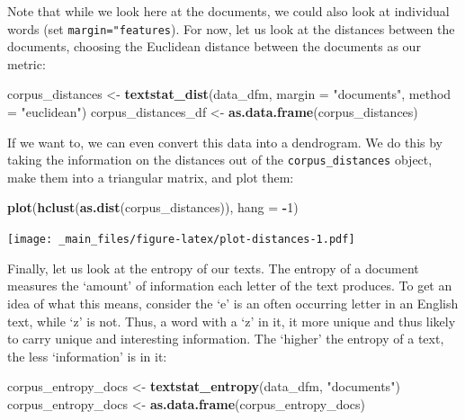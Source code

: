 \documentclass[
]{book}
\newenvironment{Shaded}{\begin{snugshade}}{\end{snugshade}}
\newcommand{\AttributeTok}[1]{\textcolor[rgb]{0.13,0.29,0.53}{#1}}
\newcommand{\DecValTok}[1]{\textcolor[rgb]{0.00,0.00,0.81}{#1}}
\newcommand{\FunctionTok}[1]{\textcolor[rgb]{0.13,0.29,0.53}{\textbf{#1}}}
\newcommand{\NormalTok}[1]{#1}
\newcommand{\OtherTok}[1]{\textcolor[rgb]{0.56,0.35,0.01}{#1}}
\newcommand{\SpecialCharTok}[1]{\textcolor[rgb]{0.81,0.36,0.00}{\textbf{#1}}}
\newcommand{\StringTok}[1]{\textcolor[rgb]{0.31,0.60,0.02}{#1}}
\begin{document}
Note that while we look here at the documents, we could also look at individual words (set \texttt{margin="features}). For now, let us look at the distances between the documents, choosing the Euclidean distance between the documents as our metric:

\begin{Shaded}
\begin{Highlighting}[]
\NormalTok{corpus\_distances }\OtherTok{\textless{}{-}} \FunctionTok{textstat\_dist}\NormalTok{(data\_dfm, }\AttributeTok{margin =} \StringTok{"documents"}\NormalTok{, }\AttributeTok{method =} \StringTok{"euclidean"}\NormalTok{)}
\NormalTok{corpus\_distances\_df }\OtherTok{\textless{}{-}} \FunctionTok{as.data.frame}\NormalTok{(corpus\_distances)}
\end{Highlighting}
\end{Shaded}

If we want to, we can even convert this data into a dendrogram. We do this by taking the information on the distances out of the \texttt{corpus\_distances} object, make them into a triangular matrix, and plot them:

\begin{Shaded}
\begin{Highlighting}[]
\FunctionTok{plot}\NormalTok{(}\FunctionTok{hclust}\NormalTok{(}\FunctionTok{as.dist}\NormalTok{(corpus\_distances)), }\AttributeTok{hang =} \SpecialCharTok{{-}}\DecValTok{1}\NormalTok{)}
\end{Highlighting}
\end{Shaded}

\texttt{[image: \_main\_files/figure-latex/plot-distances-1.pdf]}

Finally, let us look at the entropy of our texts. The entropy of a document measures the `amount' of information each letter of the text produces. To get an idea of what this means, consider the `e' is an often occurring letter in an English text, while `z' is not. Thus, a word with a `z' in it, it more unique and thus likely to carry unique and interesting information. The `higher' the entropy of a text, the less `information' is in it:

\begin{Shaded}
\begin{Highlighting}[]
\NormalTok{corpus\_entropy\_docs }\OtherTok{\textless{}{-}} \FunctionTok{textstat\_entropy}\NormalTok{(data\_dfm, }\StringTok{"documents"}\NormalTok{)}
\NormalTok{corpus\_entropy\_docs }\OtherTok{\textless{}{-}} \FunctionTok{as.data.frame}\NormalTok{(corpus\_entropy\_docs)}
\end{Highlighting}
\end{Shaded}
\end{document}
